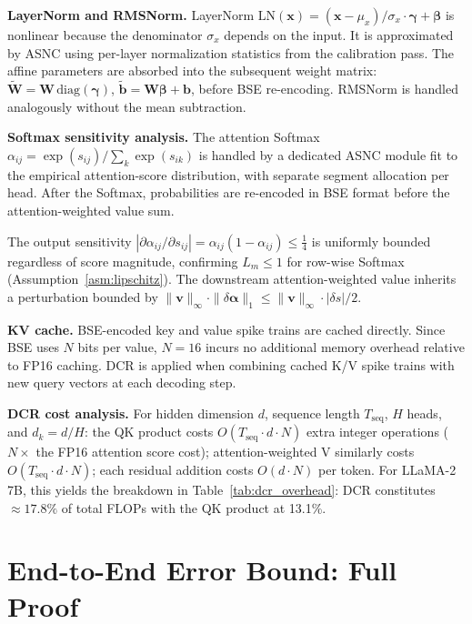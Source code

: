 \documentclass{article}
\theoremstyle{plain}
\theoremstyle{definition}
\theoremstyle{remark}
\begin{document}
\noindent\textbf{LayerNorm and RMSNorm.}
LayerNorm $\mathrm{LN}(\mathbf{x}) = (\mathbf{x}-\mu_x)/\sigma_x \cdot
\boldsymbol{\gamma} + \boldsymbol{\beta}$ is nonlinear because the denominator
$\sigma_x$ depends on the input. It is approximated by ASNC using per-layer
normalization statistics from the calibration pass. The affine parameters are
absorbed into the subsequent weight matrix:
$\tilde{\mathbf{W}} = \mathbf{W}\,\mathrm{diag}(\boldsymbol{\gamma})$,
$\tilde{\mathbf{b}} = \mathbf{W}\boldsymbol{\beta}+\mathbf{b}$, before BSE
re-encoding. RMSNorm is handled analogously without the mean subtraction.

\noindent\textbf{Softmax sensitivity analysis.}
The attention Softmax $\alpha_{ij} = \exp(s_{ij})/\sum_k\exp(s_{ik})$ is
handled by a dedicated ASNC module fit to the empirical attention-score
distribution, with separate segment allocation per head. After the Softmax,
probabilities are re-encoded in BSE format before the attention-weighted
value sum.

The output sensitivity $|\partial\alpha_{ij}/\partial s_{ij}| =
\alpha_{ij}(1-\alpha_{ij}) \le \tfrac{1}{4}$ is uniformly bounded regardless
of score magnitude, confirming $L_m \le 1$ for row-wise Softmax
(Assumption~\ref{asm:lipschitz}). The downstream attention-weighted value
inherits a perturbation bounded by $\|\mathbf{v}\|_\infty \cdot
\|\delta\boldsymbol{\alpha}\|_1 \le \|\mathbf{v}\|_\infty \cdot |\delta s|/2$.

\noindent\textbf{KV cache.}
BSE-encoded key and value spike trains are cached directly. Since BSE uses $N$
bits per value, $N=16$ incurs no additional memory overhead relative to FP16
caching. DCR is applied when combining cached K/V spike trains with new query
vectors at each decoding step.

\noindent\textbf{DCR cost analysis.}
For hidden dimension $d$, sequence length $T_\mathrm{seq}$, $H$ heads, and
$d_k = d/H$: the QK product costs $O(T_\mathrm{seq} \cdot d \cdot N)$ extra
integer operations ($N\times$ the FP16 attention score cost);
attention-weighted V similarly costs $O(T_\mathrm{seq} \cdot d \cdot N)$; each
residual addition costs $O(d \cdot N)$ per token. For LLaMA-2 7B, this yields
the breakdown in Table~\ref{tab:dcr_overhead}: DCR constitutes
$\approx\!17.8\%$ of total FLOPs with the QK product at 13.1\%.

\section{End-to-End Error Bound: Full Proof}
\label{app:e2e_proof}
\end{document}
